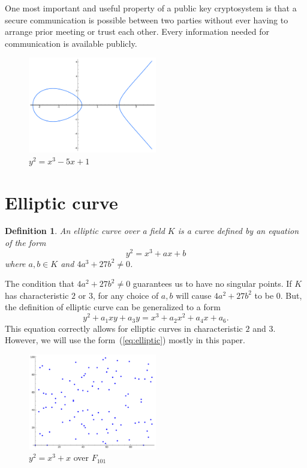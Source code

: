 \documentclass[11pt]{article}
\newtheorem{definition}{Definition}
\begin{document}
One most important and useful property of a public key cryptosystem is that a secure communication is possible between two parties without ever having to arrange prior meeting or trust each other. Every information needed for communication is available publicly.

\begin{figure}[t]
\centering
\includegraphics[width=0.5\textwidth]{2.pdf}
\caption{$y^2 = x^3 - 5x + 1$}
\end{figure}

\section{Elliptic curve}
\begin{definition}
An elliptic curve over a field $K$ is a curve defined by an equation of the form 
\begin{equation}
y^2 = x^3+ax+b \label{eq:elliptic}
\end{equation}
where $a,b \in K$ and $4a^3 + 27b^2 \ne 0$.
\end{definition}
The condition that $4a^2 + 27b^2 \ne 0$ guarantees us to have no singular points. If $K$ has characteristic $2$ or $3$, for any choice of $a,b$ will cause $4a^2 + 27b^2$ to be $0$. But, the definition of elliptic curve can be generalized to a form
$$y^2 + a_1xy + a_3y = x^3 + a_2x^2 + a_4x + a_6.$$
This equation correctly allows for elliptic curves in characteristic $2$ and $3$. However, we will use the form~(\ref{eq:elliptic}) mostly in this paper.

\begin{figure}[h]
\centering
\includegraphics[width=0.5\textwidth]{1.pdf}
\caption{$y^2 = x^3 + x$ over $F_{101}$}
\end{figure}
\end{document}
